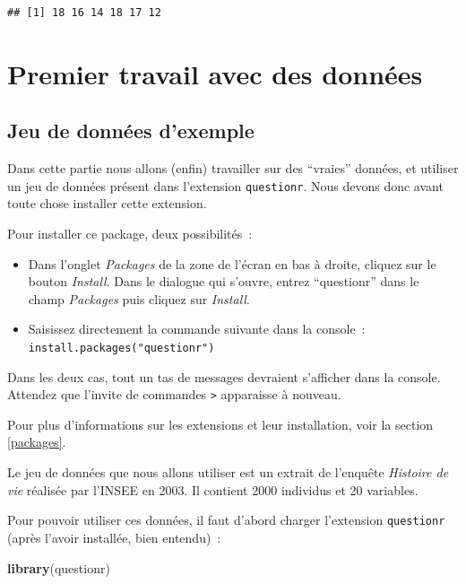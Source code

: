 \documentclass[
  12pt,
]{book}
\newenvironment{Shaded}{\begin{snugshade}}{\end{snugshade}}
\newcommand{\KeywordTok}[1]{\textcolor[rgb]{0.13,0.29,0.53}{\textbf{#1}}}
\newcommand{\NormalTok}[1]{#1}
\providecommand{\tightlist}{%
  \setlength{\itemsep}{0pt}\setlength{\parskip}{0pt}}
\begin{document}
\begin{verbatim}
## [1] 18 16 14 18 17 12
\end{verbatim}

\hypertarget{premier-travail-avec-des-donnuxe9es}{%
\section{Premier travail avec des données}\label{premier-travail-avec-des-donnuxe9es}}

\hypertarget{jeu-de-donnuxe9es-dexemple}{%
\subsection{Jeu de données d'exemple}\label{jeu-de-donnuxe9es-dexemple}}

Dans cette partie nous allons (enfin) travailler sur des ``vraies'' données, et utiliser un jeu de données présent dans l'extension \texttt{questionr}. Nous devons donc avant toute chose installer cette extension.

Pour installer ce package, deux possibilités~:

\begin{itemize}
\tightlist
\item
  Dans l'onglet \emph{Packages} de la zone de l'écran en bas à droite, cliquez sur le bouton \emph{Install}. Dans le dialogue qui s'ouvre, entrez ``questionr'' dans le champ \emph{Packages} puis cliquez sur \emph{Install}.
\item
  Saisissez directement la commande suivante dans la console~: \texttt{install.packages("questionr")}
\end{itemize}

Dans les deux cas, tout un tas de messages devraient s'afficher dans la console. Attendez que l'invite de commandes \texttt{\textgreater{}} apparaisse à nouveau.

Pour plus d'informations sur les extensions et leur installation, voir la section \ref{packages}.

Le jeu de données que nous allons utiliser est un extrait de l'enquête \emph{Histoire de vie} réalisée par l'INSEE en 2003. Il contient 2000 individus et 20 variables.

Pour pouvoir utiliser ces données, il faut d'abord charger l'extension \texttt{questionr} (après l'avoir installée, bien entendu)~:

\begin{Shaded}
\begin{Highlighting}[]
\KeywordTok{library}\NormalTok{(questionr)}
\end{Highlighting}
\end{Shaded}
\end{document}
